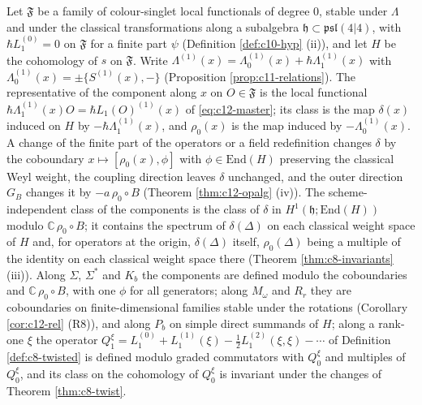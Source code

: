\begin{definition}
\label{def:c12-class}
Let $\mathfrak F$ be a family of colour-singlet local functionals of degree $0$, stable under $\Lambda$ and under the classical transformations along a subalgebra $\mathfrak h\subset\mathfrak{psl}(4|4)$, with $\hbar L_1^{(0)}=0$ on $\mathfrak F$ for a finite part $\psi$ (Definition \ref{def:c10-hyp} (ii)), and let $H$ be the cohomology of $s$ on $\mathfrak F$. Write $\Lambda^{(1)}(x)=\Lambda^{(1)}_0(x)+\hbar\Lambda^{(1)}_1(x)$ with $\Lambda^{(1)}_0(x)=\pm\{S^{(1)}(x),-\}$ (Proposition \ref{prop:c11-relations}). The representative of the component along $x$ on $O\in\mathfrak F$ is the local functional $\hbar\Lambda^{(1)}_1(x)O=\hbar L_1(O)^{(1)}(x)$ of \eqref{eq:c12-master}; its class is the map $\delta(x)$ induced on $H$ by $-\hbar\Lambda^{(1)}_1(x)$, and $\rho_0(x)$ is the map induced by $-\Lambda^{(1)}_0(x)$. A change of the finite part of the operators or a field redefinition changes $\delta$ by the coboundary $x\mapsto[\rho_0(x),\phi]$ with $\phi\in\mathrm{End}(H)$ preserving the classical Weyl weight, the coupling direction leaves $\delta$ unchanged, and the outer direction $G_B$ changes it by $-a\,\rho_0\circ B$ (Theorem \ref{thm:c12-opalg} (iv)). The scheme-independent class of the components is the class of $\delta$ in $H^1(\mathfrak h;\mathrm{End}(H))$ modulo $\mathbb C\,\rho_0\circ B$; it contains the spectrum of $\delta(\Delta)$ on each classical weight space of $H$ and, for operators at the origin, $\delta(\Delta)$ itself, $\rho_0(\Delta)$ being a multiple of the identity on each classical weight space there (Theorem \ref{thm:c8-invariants} (iii)). Along $\Sigma$, $\Sigma^*$ and $K_b$ the components are defined modulo the coboundaries and $\mathbb C\,\rho_0\circ B$, with one $\phi$ for all generators; along $M_\omega$ and $R_r$ they are coboundaries on finite-dimensional families stable under the rotations (Corollary \ref{cor:c12-rel} (R8)), and along $P_b$ on simple direct summands of $H$; along a rank-one $\xi$ the operator $Q^\xi_1=L_1^{(0)}+L_1^{(1)}(\xi)-\tfrac12L_1^{(2)}(\xi,\xi)-\cdots$ of Definition \ref{def:c8-twisted} is defined modulo graded commutators with $Q^\xi_0$ and multiples of $Q^\xi_0$, and its class on the cohomology of $Q^\xi_0$ is invariant under the changes of Theorem \ref{thm:c8-twist}.
\end{definition}

